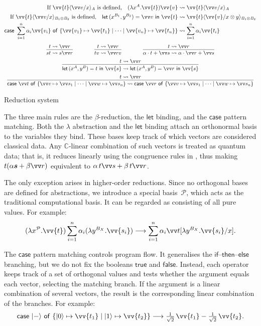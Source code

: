 \documentclass[runningheads,orivec,envcountsame,envcountsect]{llncs}
\newcommand\ket[1]{\ensuremath{|#1\rangle}}
\newcommand\lra{\longrightarrow}
\newcommand\ansubst[2]{\ensuremath{\langle #1 \rangle_{#2}}}
\newcommand\AbsBasis{\ensuremath{\mathcal{P}}}
\def\C{\mathbb{C}}            %
\def\Pair#1#2{(#1,#2)} %
\def\Lam#1#2#3{\lambda#1^{#2}{.}#3} %
\def\letkeyword{\mathsf{let}}
\def\inkeyword{\mathsf{in}}
\def\LetP#1#2#3#4#5#6{\letkeyword\,\Pair{#1^{#2}}{#3^{#4}}=#5~\inkeyword~#6}
\def\case#1#2#3#4#5{\ensuremath{\mathsf{case}~#1~\mathsf{of}~\{#2\mapsto #4 \mid #3\mapsto #5\}}}
\def\gencase#1#2#3#4#5{\ensuremath{\mathsf{case}~#1~\mathsf{of}~\{#2\mapsto #4 \mid \dotsb \mid #3\mapsto #5\}}}
\def\lraneq{\rightsquigarrow}
\newcommand\basis[1]{\ensuremath{B_{ #1 }}}
\begin{document}
\begin{table}[t]
  \begin{align*}
    \text{If }\vv{t}\ansubst{\vv v/x}{A}\text{ is defined,}\quad
    (\Lam{x}{A}{\vv{t}})\vv{v}
    &\lraneq \vv{t}\ansubst{\vv v/x}{A}\\
    \text{If }\vv{t}\ansubst{\vv v/x}{B_1\otimes B_2}\text{ is defined,}\quad
    \LetP{x}{B_1}{y}{B_2}{\vv v}{\vv{t}}
    &\lraneq \vv{t}\ansubst{\vv{v}/x\otimes y}{B_1\otimes B_2}\\
    \gencase{\sum_{i=1}^{n}\alpha_i \vv{v_i}}{\vv{v_1}}{\vv{v_n}}{\vv{t_1}}{\vv{t_n}}
    &\lraneq \sum_{i=1}^{n}\alpha_i \vv{t_i}
  \end{align*}
  \[
    \begin{array}{c}
      \infer{st\lraneq s\vv r}{t\lraneq \vv r}
      \qquad\qquad
      \infer{tv\lraneq \vv rv}{t\lraneq\vv r}
      \qquad\qquad
      \infer{\alpha\cdot t+\vv s\lraneq\alpha\cdot\vv r+\vv s}{t\lraneq\vv r}
      \\[5pt]
      \infer{\LetP{x}{A}{y}{B}{t}{\vv{s}}\lraneq
      \LetP{x}{A}{y}{B}{\vv r}{\vv{s}}}{t\lraneq \vv r} 
      \\[5pt]
      \infer{\gencase{\vv t}{\vv v}{\vv w}{\vv s_1}{\vv s_n}\lraneq
      \gencase{\vv r}{\vv v}{\vv w}{\vv s_1}{\vv s_n}}{t\lraneq \vv r}
    \end{array}
  \]
  \caption{Reduction system}
  \label{tab:Reduction}
\end{table}

The three main rules are the $\beta$-reduction, the $\mathsf{let}$ binding, and
the $\mathsf{case}$ pattern matching. Both the $\lambda$ abstraction and the
$\mathsf{let}$ binding attach an orthonormal basis to the variables they bind.
These bases keep track of which vectors are considered classical data.  Any
$\C$-linear combination of such vectors is treated as quantum data; that is, it
reduces linearly using the congruence rules in
, thus making $t(\alpha\vec
s+\beta\vv r)$ equivalent to $\alpha\,t\vv s+\beta\,t\vv r$.

The only exception arises in higher-order reductions. Since no orthogonal bases
are defined for abstractions, we introduce a special basis~$\AbsBasis$, which
acts as the traditional computational basis. It can be regarded as consisting
of all pure values. For example:
\[
  (\Lam{x}{\AbsBasis}{\vv{t}})
  \sum_{i=1}^{n}\alpha_i(\Lam{y}{\basis{X}}{\vv{s_i}})
  \lra
  \sum_{i=1}^n\alpha_i\vv t[\Lam{y}{\basis{X}}{\vv{s_i}}/x].
\]

The $\mathsf{case}$ pattern matching controls program flow. It generalises the
$\mathsf{if}$--$\mathsf{then}$--$\mathsf{else}$ branching, but we do not fix
the booleans $\mathsf{true}$ and $\mathsf{false}$. Instead, each operator keeps
track of a set of orthogonal values and tests whether the argument equals each
vector, selecting the matching branch. If the argument is a linear combination
of several vectors, the result is the corresponding linear combination of the
branches. For example:
\[
  \case{\ket{-}}{\ket{0}}{\ket{1}}{\vv{t_1}}{\vv{t_2}} \lra
  \tfrac{1}{\sqrt{2}}\,\vv{t_1} - \tfrac{1}{\sqrt{2}}\,\vv{t_2}.
\]
\end{document}
